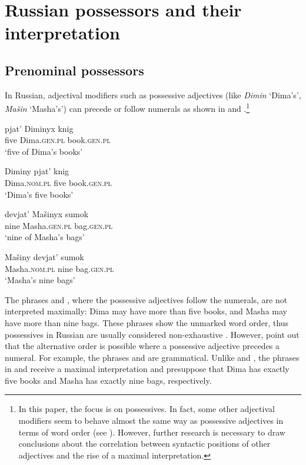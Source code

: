 \documentclass[output=paper,
colorlinks,
citecolor=brown,
newtxmath
]{langscibook}
\begin{document}
\section{Russian possessors and their interpretation}\label{FW}
\subsection{Prenominal possessors}\label{PreP}

In Russian, adjectival modifiers such as possessive adjectives (like \textit{Dimin} `Dima's', \textit{Mašin} `Masha's') can precede or follow numerals as shown in  and .\footnote{In this paper, the focus is on possessives. In fact, some other adjectival modifiers seem to behave almost the same way as possessive adjectives in terms of word order (see ). However, further research is necessary to draw conclusions about the correlation between syntactic positions of other adjectives and the rise of a maximal interpretation.}

\ea\label{Num-Poss}
\ea\label{NumPoss} \gll pjat' Diminyx knig\\
five Dima.\textsc{gen.pl} book.\textsc{gen.pl}\\
\glt `five of Dima's books'

\ex\label{PossNum} \gll Diminy pjat' knig\\
Dima.\textsc{nom.pl} five book.\textsc{gen.pl}\\
\glt `Dima's five books' \hfill \citep[173]{Kagan.Pereltsvaig2012}
\z\z

\ea\label{Num-Poss2}
\ea\label{NumPoss2} \gll devjat' Mašinyx sumok\\
nine Masha.\textsc{gen.pl} bag.\textsc{gen.pl}\\
\glt `nine of Masha's bags'

\ex\label{PossNum2} \gll Mašiny devjat' sumok\\
Masha.\textsc{nom.pl} nine bag.\textsc{gen.pl}\\
\glt `Masha's nine bags'
\z\z

\noindent The phrases  and , where the possessive adjectives follow the numerals, are not interpreted maximally: Dima may have more than five books, and Masha may have more than nine bags. These phrases show the unmarked word order, thus possessives in Russian are usually considered non-exhaustive \citep[see, e.g.,][]{Partee2006}. However, \citet{Kagan.Pereltsvaig2012} point out that the alternative order is possible where a possessive adjective precedes a numeral. For example, the phrases  and  are grammatical. Unlike  and , the phrases in  and  receive a maximal interpretation and presuppose that Dima has exactly five books and Masha has exactly nine bags, respectively.
\end{document}
